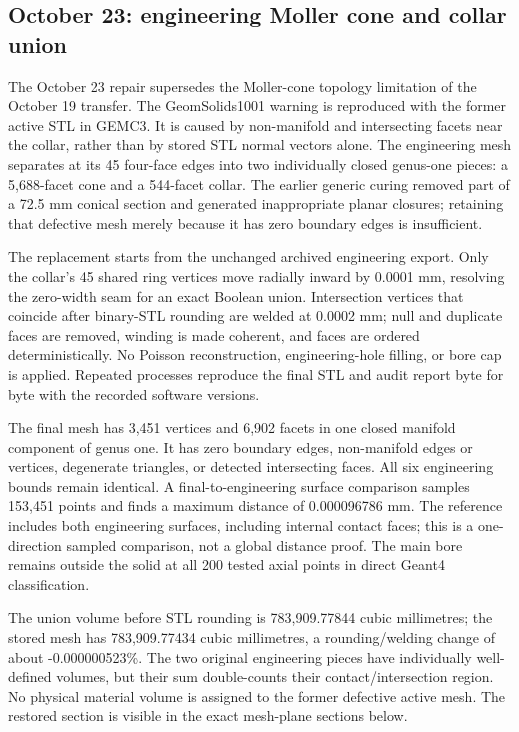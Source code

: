 \subsection{October 23: engineering Moller cone and collar union}
\label{sec:htcc-moller-repair}

The October 23 repair supersedes the Moller-cone topology limitation of the October 19 transfer. The
GeomSolids1001 warning is reproduced with the former active STL in GEMC3. It is caused by non-manifold and
intersecting facets near the collar, rather than by stored STL normal vectors alone. The engineering mesh
separates at its 45 four-face edges into two individually closed genus-one pieces: a 5,688-facet cone and a
544-facet collar. The earlier generic curing removed part of a 72.5 mm conical section and generated
inappropriate planar closures; retaining that defective mesh merely because it has zero boundary edges is
insufficient.

The replacement starts from the unchanged archived engineering export. Only the collar's 45 shared ring
vertices move radially inward by 0.0001 mm, resolving the zero-width seam for an exact Boolean union.
Intersection vertices that coincide after binary-STL rounding are welded at 0.0002 mm; null and duplicate
faces are removed, winding is made coherent, and faces are ordered deterministically. No Poisson
reconstruction, engineering-hole filling, or bore cap is applied. Repeated processes reproduce the final STL
and audit report byte for byte with the recorded software versions.

The final mesh has 3,451 vertices and 6,902 facets in one closed manifold component of genus one. It has zero
boundary edges, non-manifold edges or vertices, degenerate triangles, or detected intersecting faces. All six
engineering bounds remain identical. A final-to-engineering surface comparison samples 153,451 points and
finds a maximum distance of 0.000096786 mm. The reference includes both engineering surfaces, including
internal contact faces; this is a one-direction sampled comparison, not a global distance proof. The main bore
remains outside the solid at all 200 tested axial points in direct Geant4 classification.

The union volume before STL rounding is 783,909.77844 cubic millimetres; the stored mesh has 783,909.77434
cubic millimetres, a rounding/welding change of about -0.000000523\%. The two original engineering pieces have
individually well-defined volumes, but their sum double-counts their contact/intersection region. No physical
material volume is assigned to the former defective active mesh. The restored section is visible in the exact
mesh-plane sections below.

